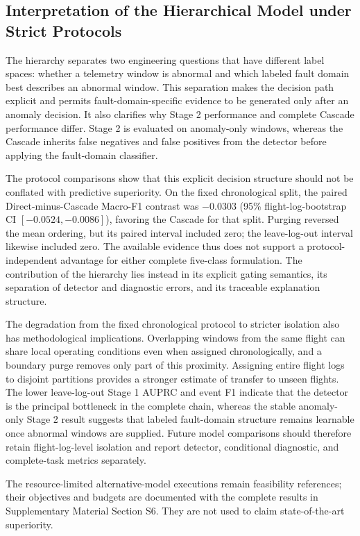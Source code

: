 \subsection{Interpretation of the Hierarchical Model under Strict Protocols}

The hierarchy separates two engineering questions that have different label spaces: whether a telemetry window is abnormal and which labeled fault domain best describes an abnormal window. This separation makes the decision path explicit and permits fault-domain-specific evidence to be generated only after an anomaly decision. It also clarifies why Stage 2 performance and complete Cascade performance differ. Stage 2 is evaluated on anomaly-only windows, whereas the Cascade inherits false negatives and false positives from the detector before applying the fault-domain classifier.

The protocol comparisons show that this explicit decision structure should not be conflated with predictive superiority. On the fixed chronological split, the paired Direct-minus-Cascade Macro-F1 contrast was $-0.0303$ (95\% flight-log-bootstrap CI $[-0.0524,-0.0086]$), favoring the Cascade for that split. Purging reversed the mean ordering, but its paired interval included zero; the leave-log-out interval likewise included zero. The available evidence thus does not support a protocol-independent advantage for either complete five-class formulation. The contribution of the hierarchy lies instead in its explicit gating semantics, its separation of detector and diagnostic errors, and its traceable explanation structure.

The degradation from the fixed chronological protocol to stricter isolation also has methodological implications. Overlapping windows from the same flight can share local operating conditions even when assigned chronologically, and a boundary purge removes only part of this proximity. Assigning entire flight logs to disjoint partitions provides a stronger estimate of transfer to unseen flights. The lower leave-log-out Stage 1 AUPRC and event F1 indicate that the detector is the principal bottleneck in the complete chain, whereas the stable anomaly-only Stage 2 result suggests that labeled fault-domain structure remains learnable once abnormal windows are supplied. Future model comparisons should therefore retain flight-log-level isolation and report detector, conditional diagnostic, and complete-task metrics separately.

The resource-limited alternative-model executions remain feasibility references; their objectives and budgets are documented with the complete results in Supplementary Material Section S6. They are not used to claim state-of-the-art superiority.
